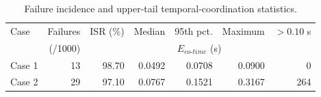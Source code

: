 \begin{table}[!t]
\centering
\scriptsize
\setlength{\tabcolsep}{1.2pt}
\renewcommand{\arraystretch}{1.08}
\caption{Failure incidence and upper-tail temporal-coordination statistics.}
\label{tab:failure_delay_analysis}
\begin{tabular}{@{}lrrrrrr@{}}
\toprule
Case & Failures & ISR (\%) & Median & 95th pct. & Maximum & $>0.10$ s \\
 & (/1000) & & \multicolumn{3}{c}{$E_{co\text{-}time}$ (s)} &  \\
\midrule
Case 1 & 13 & 98.70 & 0.0492 & 0.0708 & 0.0900 & 0 \\
Case 2 & 29 & 97.10 & 0.0767 & 0.1521 & 0.3167 & 264 \\
\bottomrule
\end{tabular}
\end{table}
